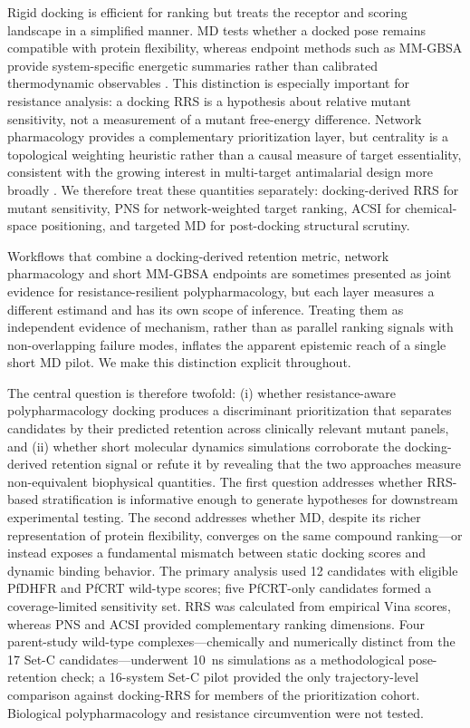 \documentclass[journal=jcisd8,manuscript=article,layout=traditional]{achemso}
\begin{document}
Rigid docking is efficient for ranking but treats the receptor and scoring landscape in a simplified manner. MD tests whether a docked pose remains compatible with protein flexibility, whereas endpoint methods such as MM-GBSA provide system-specific energetic summaries rather than calibrated thermodynamic observables \citep{gmx_mmpbsa_2021,wang2019_mmgbsa}. This distinction is especially important for resistance analysis: a docking RRS is a hypothesis about relative mutant sensitivity, not a measurement of a mutant free-energy difference. Network pharmacology provides a complementary prioritization layer, but centrality is a topological weighting heuristic rather than a causal measure of target essentiality, consistent with the growing interest in multi-target antimalarial design more broadly \citep{multi_target_antimalarials_2025}. We therefore treat these quantities separately: docking-derived RRS for mutant sensitivity, PNS for network-weighted target ranking, ACSI for chemical-space positioning, and targeted MD for post-docking structural scrutiny.

Workflows that combine a docking-derived retention metric, network pharmacology and short MM-GBSA endpoints are sometimes presented as joint evidence for resistance-resilient polypharmacology, but each layer measures a different estimand and has its own scope of inference. Treating them as independent evidence of mechanism, rather than as parallel ranking signals with non-overlapping failure modes, inflates the apparent epistemic reach of a single short MD pilot. We make this distinction explicit throughout.

The central question is therefore twofold: (i) whether resistance-aware polypharmacology docking produces a discriminant prioritization that separates candidates by their predicted retention across clinically relevant mutant panels, and (ii) whether short molecular dynamics simulations corroborate the docking-derived retention signal or refute it by revealing that the two approaches measure non-equivalent biophysical quantities. The first question addresses whether RRS-based stratification is informative enough to generate hypotheses for downstream experimental testing. The second addresses whether MD, despite its richer representation of protein flexibility, converges on the same compound ranking---or instead exposes a fundamental mismatch between static docking scores and dynamic binding behavior. The primary analysis used \num{12} candidates with eligible PfDHFR and PfCRT wild-type scores; five PfCRT-only candidates formed a coverage-limited sensitivity set. RRS was calculated from empirical Vina scores, whereas PNS and ACSI provided complementary ranking dimensions. Four parent-study wild-type complexes---chemically and numerically distinct from the 17 Set-C candidates---underwent \qty{10}{\nano\second} simulations as a methodological pose-retention check; a 16-system Set-C pilot provided the only trajectory-level comparison against docking-RRS for members of the prioritization cohort. Biological polypharmacology and resistance circumvention were not tested.
\end{document}
